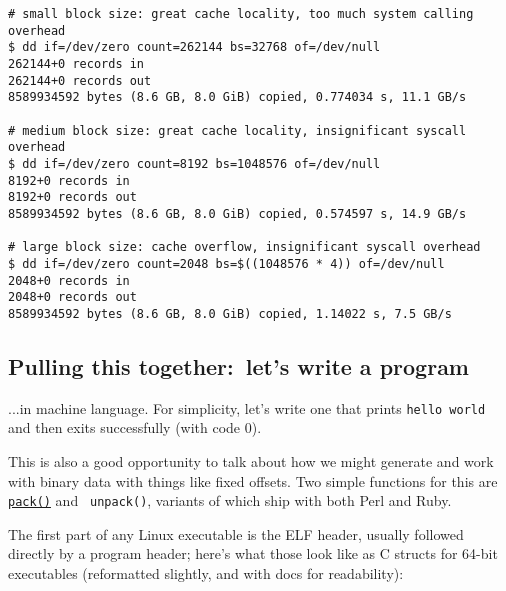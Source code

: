 \documentclass{article}
\newcommand{\lnk}[2]{\href{#1}{\textcolor[rgb]{1.0,0.0,0.0}{#2}}}
\begin{document}
  \begin{verbatim}
# small block size: great cache locality, too much system calling overhead
$ dd if=/dev/zero count=262144 bs=32768 of=/dev/null
262144+0 records in
262144+0 records out
8589934592 bytes (8.6 GB, 8.0 GiB) copied, 0.774034 s, 11.1 GB/s

# medium block size: great cache locality, insignificant syscall overhead
$ dd if=/dev/zero count=8192 bs=1048576 of=/dev/null
8192+0 records in
8192+0 records out
8589934592 bytes (8.6 GB, 8.0 GiB) copied, 0.574597 s, 14.9 GB/s

# large block size: cache overflow, insignificant syscall overhead
$ dd if=/dev/zero count=2048 bs=$((1048576 * 4)) of=/dev/null
2048+0 records in
2048+0 records out
8589934592 bytes (8.6 GB, 8.0 GiB) copied, 1.14022 s, 7.5 GB/s\end{verbatim}

  \subsection{Pulling this together:~let's write a program}
  ...in machine language. For simplicity, let's write one that prints {\tt hello
  world} and then exits successfully (with code 0).

  This is also a good opportunity to talk about how we might generate and work
  with binary data with things like fixed offsets. Two simple functions for this
  are \lnk{https://perldoc.perl.org/perlpacktut.html}{\tt pack()} and {\tt
  unpack()}, variants of which ship with both Perl and Ruby.

  The first part of any Linux executable is the ELF header, usually followed
  directly by a program header; here's what those look like as C structs for
  64-bit executables (reformatted slightly, and with docs for readability):
\end{document}
